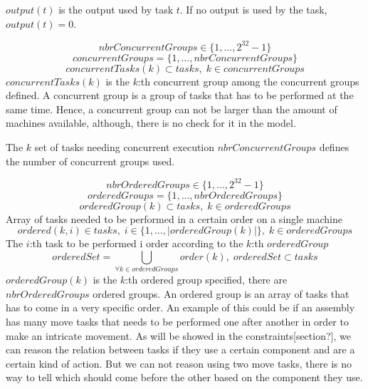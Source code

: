 \documentclass[10pt,a4paper]{report}
\begin{document}
$output(t)$ is the output used by task $t$. If no output is used by the task, $output(t) = 0$.


\begin{equation}\label{eq:8}
nbrConcurrentGroups \in \{1 , \ldots , 2^{32}-1\}
\end{equation}
\begin{equation}\label{eq:17}
concurrentGroups = \{1 , \ldots , nbrConcurrentGroups\}
\end{equation}
\begin{equation}\label{eq:30}
concurrentTasks(k) \subset tasks, \; k \in concurrentGroups
\end{equation}
$concurrentTasks(k)$ is the $k$:th concurrent group among the concurrent groups defined. A concurrent group is a group of tasks that has to be performed at the same time. Hence, a concurrent group can not be larger than the amount of machines available, although, there is no check for it in the model. 

The $k$ set of tasks needing concurrent execution
$nbrConcurrentGroups$ defines the number of concurrent groups used. 

\begin{equation}\label{eq:9}
nbrOrderedGroups \in \{1 , \ldots , 2^{32}-1\}
\end{equation}
\begin{equation}\label{eq:9}
orderedGroups = \{1 , \ldots , nbrOrderedGroups\}
\end{equation}
\begin{equation}\label{eq:18}
orderedGroup(k) \subset tasks, \; k \in orderedGroups
\end{equation}
Array of tasks needed to be performed in a certain order on a single machine
\begin{equation}\label{eq:32}
ordered(k,i) \in tasks, \; i \in \{1 , \ldots , |orderedGroup(k)|\}, \; k \in orderedGroups
\end{equation}
The $i$:th task to be performed i order according to the $k$:th $orderedGroup$
\begin{equation}\label{eq:39}
orderedSet = \bigcup_{\forall k \in orderedGroups}order(k), \; orderedSet \subset tasks\end{equation}
$orderedGroup(k)$ is the $k$:th ordered group specified, there are $nbrOrderedGroups$ ordered groups. An ordered group is an array of tasks that has to come in a very specific order. An example of this could be if an assembly has many move tasks that needs to be performed one after another in order to make an intricate movement. As will be showed in the constraints[section?], we can reason the relation between tasks if they use a certain component and are a certain kind of action. But we can not reason using two move tasks, there is no way to tell which should come before the other based on the component they use. 
\end{document}
